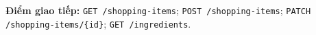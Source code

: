\textbf{Điểm giao tiếp:} {\small\texttt{GET /\allowbreak{}\allowbreak{}shopping-\allowbreak{}items}}; {\small\texttt{POST /\allowbreak{}\allowbreak{}shopping-\allowbreak{}items}}; {\small\texttt{PATCH /\allowbreak{}\allowbreak{}shopping-\allowbreak{}items/\allowbreak{}\allowbreak{}\{id\}}}; {\small\texttt{GET /\allowbreak{}\allowbreak{}ingredients}}.
